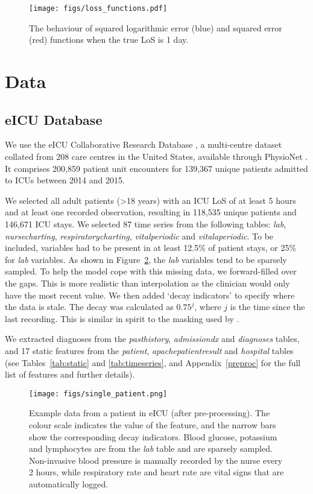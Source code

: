 \documentclass[sigconf]{acmart}
\begin{document}
\begin{figure}
  \centering
  \texttt{[image: figs/loss\_functions.pdf]}
  \caption{The behaviour of squared logarithmic error (blue) and squared error (red) functions when the true LoS is 1 day.}
 \label{fig:lossfunc}
\end{figure}

\section{Data}
\label{data}
\subsection{eICU Database}
We use the eICU Collaborative Research Database \citep{Pollard2018}, a multi-centre dataset collated from 208 care centres in the United States, available through PhysioNet \cite{Goldbergere215}. It comprises 200,859 patient unit encounters for 139,367 unique patients admitted to ICUs between 2014 and 2015. 

We selected all adult patients (\textgreater 18 years) with an ICU LoS of at least 5 hours and at least one recorded observation, resulting in 118,535 unique patients and 146,671 ICU stays. We selected 87 time series from the following tables: \textit{lab}, \textit{nursecharting}, \textit{respiratorycharting}, \textit{vitalperiodic} and \textit{vitalaperiodic}. To be included, variables had to be present in at least 12.5\% of patient stays, or 25\% for \textit{lab} variables. As shown in Figure~\ref{fig:one_patient}, the \textit{lab} variables tend to be sparsely sampled. To help the model cope with this missing data, we forward-filled over the gaps. This is more realistic than interpolation as the clinician would only have the most recent value. We then added `decay indicators' to specify where the data is stale. The decay was calculated as $0.75^j$, where $j$ is the time since the last recording. This is similar in spirit to the masking used by \citet{Che2018}.

We extracted diagnoses from the \textit{pasthistory}, \textit{admissiondx} and \textit{diagnoses} tables, and 17 static features from the \textit{patient}, \textit{apachepatientresult} and \textit{hospital} tables (see Tables~\ref{tab:static} and \ref{tab:timeseries}, and Appendix~\ref{preproc} for the full list of features and further details). 

\begin{figure}
  \centering
  \texttt{[image: figs/single\_patient.png]}
  \caption{Example data from a patient in eICU (after pre-processing). The colour scale indicates the value of the feature, and the narrow bars show the corresponding decay indicators. Blood glucose, potassium and lymphocytes are from the \textit{lab} table and are sparsely sampled. Non-invasive blood pressure is manually recorded by the nurse every 2 hours, while respiratory rate and heart rate are vital signs that are automatically logged.}
  \label{fig:one_patient}
\end{figure}
\end{document}
